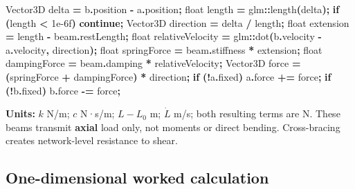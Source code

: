 \documentclass[
  10pt,
  a4paper,
]{article}
\newenvironment{Shaded}{\begin{snugshade}}{\end{snugshade}}
\newcommand{\BuiltInTok}[1]{#1}
\newcommand{\ControlFlowTok}[1]{\textcolor[rgb]{0.13,0.29,0.53}{\textbf{#1}}}
\newcommand{\DataTypeTok}[1]{\textcolor[rgb]{0.13,0.29,0.53}{#1}}
\newcommand{\FloatTok}[1]{\textcolor[rgb]{0.00,0.00,0.81}{#1}}
\newcommand{\NormalTok}[1]{#1}
\newcommand{\OperatorTok}[1]{\textcolor[rgb]{0.81,0.36,0.00}{\textbf{#1}}}
\begin{document}
\begin{Shaded}
\begin{Highlighting}[]
\NormalTok{Vector3D delta }\OperatorTok{=}\NormalTok{ b}\OperatorTok{.}\NormalTok{position }\OperatorTok{{-}}\NormalTok{ a}\OperatorTok{.}\NormalTok{position}\OperatorTok{;}
\DataTypeTok{float}\NormalTok{ length }\OperatorTok{=}\NormalTok{ glm}\OperatorTok{::}\NormalTok{length}\OperatorTok{(}\NormalTok{delta}\OperatorTok{);}
\ControlFlowTok{if} \OperatorTok{(}\NormalTok{length }\OperatorTok{\textless{}} \FloatTok{1e{-}6}\BuiltInTok{f}\OperatorTok{)} \ControlFlowTok{continue}\OperatorTok{;}
\NormalTok{Vector3D direction }\OperatorTok{=}\NormalTok{ delta }\OperatorTok{/}\NormalTok{ length}\OperatorTok{;}
\DataTypeTok{float}\NormalTok{ extension }\OperatorTok{=}\NormalTok{ length }\OperatorTok{{-}}\NormalTok{ beam}\OperatorTok{.}\NormalTok{restLength}\OperatorTok{;}
\DataTypeTok{float}\NormalTok{ relativeVelocity }\OperatorTok{=}\NormalTok{ glm}\OperatorTok{::}\NormalTok{dot}\OperatorTok{(}\NormalTok{b}\OperatorTok{.}\NormalTok{velocity }\OperatorTok{{-}}\NormalTok{ a}\OperatorTok{.}\NormalTok{velocity}\OperatorTok{,}\NormalTok{ direction}\OperatorTok{);}
\DataTypeTok{float}\NormalTok{ springForce }\OperatorTok{=}\NormalTok{ beam}\OperatorTok{.}\NormalTok{stiffness }\OperatorTok{*}\NormalTok{ extension}\OperatorTok{;}
\DataTypeTok{float}\NormalTok{ dampingForce }\OperatorTok{=}\NormalTok{ beam}\OperatorTok{.}\NormalTok{damping }\OperatorTok{*}\NormalTok{ relativeVelocity}\OperatorTok{;}
\NormalTok{Vector3D force }\OperatorTok{=} \OperatorTok{(}\NormalTok{springForce }\OperatorTok{+}\NormalTok{ dampingForce}\OperatorTok{)} \OperatorTok{*}\NormalTok{ direction}\OperatorTok{;}
\ControlFlowTok{if} \OperatorTok{(!}\NormalTok{a}\OperatorTok{.}\NormalTok{fixed}\OperatorTok{)}\NormalTok{ a}\OperatorTok{.}\NormalTok{force }\OperatorTok{+=}\NormalTok{ force}\OperatorTok{;}
\ControlFlowTok{if} \OperatorTok{(!}\NormalTok{b}\OperatorTok{.}\NormalTok{fixed}\OperatorTok{)}\NormalTok{ b}\OperatorTok{.}\NormalTok{force }\OperatorTok{{-}=}\NormalTok{ force}\OperatorTok{;}
\end{Highlighting}
\end{Shaded}

\textbf{Units:} \(k\) N/m; \(c\) N·s/m; \(L-L_0\) m; \(\dot L\) m/s;
both resulting terms are N. These beams transmit \textbf{axial} load
only, not moments or direct bending. Cross-bracing creates network-level
resistance to shear.

\subsection{One-dimensional worked
calculation}\label{one-dimensional-worked-calculation}
\end{document}

